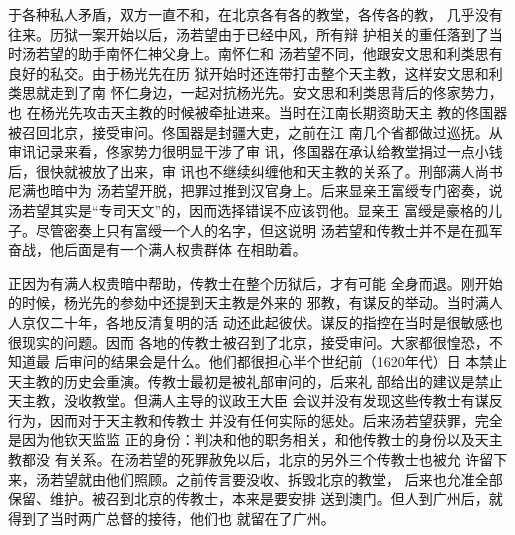 于各种私人矛盾，双方一直不和，在北京各有各的教堂，各传各的教，%
几乎没有往来。历狱一案开始以后，汤若望由于已经中风，所有辩%
护相关的重任落到了当时汤若望的助手南怀仁神父身上。南怀仁和%
汤若望不同，他跟安文思和利类思有良好的私交。由于杨光先在历%
狱开始时还连带打击整个天主教，这样安文思和利类思就走到了南%
怀仁身边，一起对抗杨光先。安文思和利类思背后的佟家势力，也%
在杨光先攻击天主教的时候被牵扯进来。当时在江南长期资助天主%
教的佟国器被召回北京，接受审问。佟国器是封疆大吏，之前在江%
南几个省都做过巡抚。从审讯记录来看，佟家势力很明显干涉了审%
讯，佟国器在承认给教堂捐过一点小钱后，很快就被放了出来，审%
讯也不继续纠缠他和天主教的关系了。刑部满人尚书尼满也暗中为%
汤若望开脱，把罪过推到汉官身上。后来显亲王富绶专门密奏，说%
汤若望其实是“专司天文”的，因而选择错误不应该罚他。显亲王%
富绶是豪格的儿子。尽管密奏上只有富绶一个人的名字，但这说明%
汤若望和传教士并不是在孤军奋战，他后面是有一个满人权贵群体%
在相助着。%
\par
正因为有满人权贵暗中帮助，传教士在整个历狱后，才有可能%
全身而退。刚开始的时候，杨光先的参劾中还提到天主教是外来的%
邪教，有谋反的举动。当时满人人京仅二十年，各地反清复明的活%
动还此起彼伏。谋反的指控在当时是很敏感也很现实的问题。因而%
各地的传教士被召到了北京，接受审问。大家都很惶恐，不知道最%
后审问的结果会是什么。他们都很担心半个世纪前（1620年代）日%
本禁止天主教的历史会重演。传教士最初是被礼部审问的，后来礼%
部给出的建议是禁止天主教，没收教堂。但满人主导的议政王大臣%
会议并没有发现这些传教士有谋反行为，因而对于天主教和传教士%
并没有任何实际的惩处。后来汤若望获罪，完全是因为他钦天监监%
正的身份：判决和他的职务相关，和他传教士的身份以及天主教都没%
有关系。在汤若望的死罪赦免以后，北京的另外三个传教士也被允%
许留下来，汤若望就由他们照顾。之前传言要没收、拆毁北京的教堂，%
后来也允准全部保留、维护。被召到北京的传教士，本来是要安排%
送到澳门。但人到广州后，就得到了当时两广总督的接待，他们也%
就留在了广州。%
